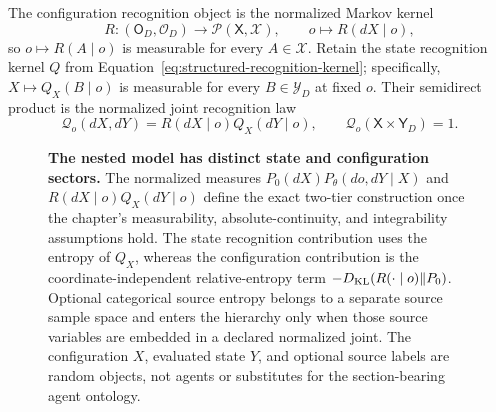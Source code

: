The configuration recognition object is the normalized Markov kernel
\begin{equation}
R:(\mathsf O_D,\mathscr O_D)
\longrightarrow\mathcal P(\mathsf X,\mathscr X),
\qquad
o\longmapsto R(dX\mid o),
\label{eq:configuration-recognition-kernel}
\end{equation}
so \(o\mapsto R(A\mid o)\) is measurable for every \(A\in\mathscr X\). Retain the state recognition kernel \(Q\) from Equation~\eqref{eq:structured-recognition-kernel}; specifically, \(X\mapsto Q_X(B\mid o)\) is measurable for every \(B\in\mathscr Y_D\) at fixed \(o\). Their semidirect product is the normalized joint recognition law
\begin{equation}
\mathcal Q_o(dX,dY)
=R(dX\mid o)Q_X(dY\mid o),
\qquad
\mathcal Q_o(\mathsf X\times\mathsf Y_D)=1.
\label{eq:hierarchical-recognition-law}
\end{equation}

\begin{figure}[tbp]
\centering
\resizebox{\textwidth}{!}{}
\caption{\textbf{The nested model has distinct state and configuration sectors.} The normalized measures \(P_0(dX)P_\theta(do,dY\mid X)\) and \(R(dX\mid o)Q_X(dY\mid o)\) define the exact two-tier construction once the chapter's measurability, absolute-continuity, and integrability assumptions hold. The state recognition contribution uses the entropy of \(Q_X\), whereas the configuration contribution is the coordinate-independent relative-entropy term \(-D_{\mathrm{KL}}(R(\mathord\cdot\mid o)\Vert P_0)\). Optional categorical source entropy belongs to a separate source sample space and enters the hierarchy only when those source variables are embedded in a declared normalized joint. The configuration \(X\), evaluated state \(Y\), and optional source labels are random objects, not agents or substitutes for the section-bearing agent ontology.}
\label{fig:magent-state-configuration-tiers}
\end{figure}

